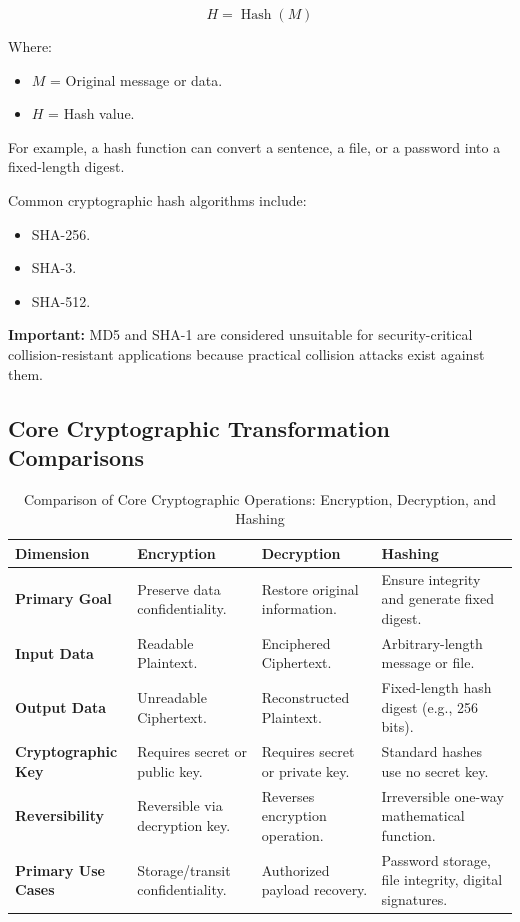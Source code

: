 \[
H=\operatorname{Hash}(M)
\]



Where:

\begin{itemize}
\item $M$ = Original message or data.
\item $H$ = Hash value.
\end{itemize}

For example, a hash function can convert a sentence, a file, or a password into a fixed-length digest.

Common cryptographic hash algorithms include:

\begin{itemize}
\item SHA-256.
\item SHA-3.
\item SHA-512.
\end{itemize}

\textbf{Important:} MD5 and SHA-1 are considered unsuitable for security-critical collision-resistant applications because practical collision attacks exist against them.

\subsection{Core Cryptographic Transformation Comparisons}

\begin{table}[htbp]
\centering
\caption{Comparison of Core Cryptographic Operations: Encryption, Decryption, and Hashing}
\label{tab:enc_dec_hash}
\begin{tabularx}{\textwidth}{p{2.6cm} p{3.3cm} p{3.3cm} X}
\toprule
\textbf{Dimension} & \textbf{Encryption} & \textbf{Decryption} & \textbf{Hashing} \\
\midrule
\textbf{Primary Goal} & Preserve data confidentiality. & Restore original information. & Ensure integrity and generate fixed digest. \\
\textbf{Input Data} & Readable Plaintext. & Enciphered Ciphertext. & Arbitrary-length message or file. \\
\textbf{Output Data} & Unreadable Ciphertext. & Reconstructed Plaintext. & Fixed-length hash digest (e.g., 256 bits). \\
\textbf{Cryptographic Key} & Requires secret or public key. & Requires secret or private key. & Standard hashes use no secret key. \\
\textbf{Reversibility} & Reversible via decryption key. & Reverses encryption operation. & Irreversible one-way mathematical function. \\
\textbf{Primary Use Cases} & Storage/transit confidentiality. & Authorized payload recovery. & Password storage, file integrity, digital signatures. \\
\bottomrule
\end{tabularx}
\end{table}


